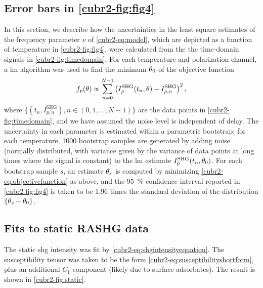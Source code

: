 \subsection{Error bars in \cref{cubr2-fig:fig4}}\label{cubr2-sup:errorbars}
In this section, we describe how the uncertainties in the least square estimates of the frequency parameter $\nu$ of \cref{cubr2-eq:model}, which are depicted as a function of temperature in \cref{cubr2-fig:fig4}, were calculated from the the time-domain signals in \cref{cubr2-fig:timedomain}.
For each temperature and polarization channel, a \gls{lm} algorithm was used to find the minimum $\theta_0$ of the objective function
\begin{equation}\label{cubr2-eq:objectivefunction}
f_p(\theta) \propto \sum_{n=0}^{N-1}\left(I^\mathrm{SHG}_p(t_n, \theta) - I^\mathrm{SHG}_{p,n}\right)^2,
\end{equation}
where $\{(t_n, I^\mathrm{SHG}_{p,n}), n\in (0, 1, \ldots, N-1)\}$ are the data points in \cref{cubr2-fig:timedomain}, and we have assumed the noise level is independent of delay.
The uncertainty in each parameter is estimated within a parametric bootstrap\citep{dekking}: for each temperature, \num{1000} bootstrap samples are generated by adding noise (normally distributed, with variance given by the variance of data points at long times where the signal is constant) to the \gls{lm} estimate $I^\mathrm{SHG}_p(t_n, \theta_0)$.
For each bootstrap sample $s$, an estimate $\theta_s$ is computed by minimizing \cref{cubr2-eq:objectivefunction} as above, and the \qty{95}{\percent} confidence interval reported in \cref{cubr2-fig:fig4} is taken to be \num{1.96} times the standard deviation of the distribution $\{\theta_s-\theta_0\}$.

\subsection{Fits to static RASHG data}\label{cubr2-sup:static}
The static \gls{shg} intensity was fit by \cref{cubr2-eq:shgintensityequation}.
The susceptibility tensor was taken to be the form \cref{cubr2-eq:susceptibilityshortform}, plus an additional $C_1$ component (likely due to surface adsorbates).
The result is shown in \cref{cubr2-fig:static}.

